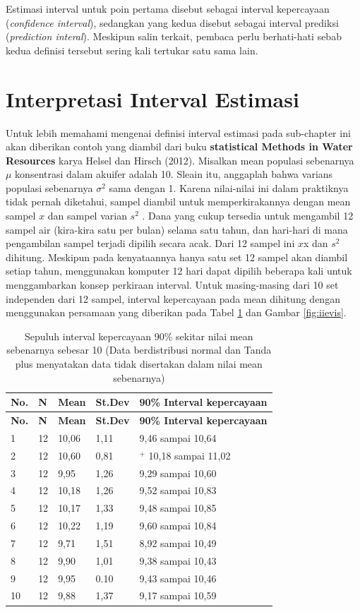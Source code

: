 \documentclass[]{book}
\begin{document}
Estimasi interval untuk poin pertama disebut sebagai interval
kepercayaan (\emph{confidence interval}), sedangkan yang kedua disebut
sebagai interval prediksi (\emph{prediction interal}). Meskipun salin
terkait, pembaca perlu berhati-hati sebab kedua definisi tersebut sering
kali tertukar satu sama lain.

\section{Interpretasi Interval
Estimasi}\label{interpretasi-interval-estimasi}

Untuk lebih memahami mengenai definisi interval estimasi pada
sub-chapter ini akan diberikan contoh yang diambil dari buku
\textbf{statistical Methods in Water Resources} karya Helsel dan Hirsch
(2012). Misalkan mean populasi sebenarnya \(\mu\) konsentrasi dalam
akuifer adalah 10. Sleain itu, anggaplah bahwa varians populasi
sebenarnya \(\sigma^2\) sama dengan 1. Karena nilai-nilai ini dalam
praktiknya tidak pernah diketahui, sampel diambil untuk memperkirakannya
dengan mean sampel \(x\) dan sampel varian \(s^2\) . Dana yang cukup
tersedia untuk mengambil 12 sampel air (kira-kira satu per bulan) selama
satu tahun, dan hari-hari di mana pengambilan sampel terjadi dipilih
secara acak. Dari 12 sampel ini \(x\)x dan \(s^2\) dihitung. Meskipun
pada kenyataannya hanya satu set 12 sampel akan diambil setiap tahun,
menggunakan komputer 12 hari dapat dipilih beberapa kali untuk
menggambarkan konsep perkiraan interval. Untuk masing-masing dari 10 set
independen dari 12 sampel, interval kepercayaan pada mean dihitung
dengan menggunakan persamaan yang diberikan pada Tabel \ref{tab:iie} dan
Gambar \ref{fig:iievis}.

\begin{longtable}[]{@{}lllll@{}}
\caption{\label{tab:iie} Sepuluh interval kepercayaan 90\% sekitar nilai
mean sebenarnya sebesar 10 (Data berdistribusi normal dan Tanda plus
menyatakan data tidak disertakan dalam nilai mean
sebenarnya)}\tabularnewline
\toprule
\textbf{No.} & \textbf{N} & \textbf{Mean} & \textbf{St.Dev} &
\textbf{90\% Interval kepercayaan}\tabularnewline
\midrule
\endfirsthead
\toprule
\textbf{No.} & \textbf{N} & \textbf{Mean} & \textbf{St.Dev} &
\textbf{90\% Interval kepercayaan}\tabularnewline
\midrule
\endhead
1 & 12 & 10,06 & 1,11 & 9,46 sampai 10,64\tabularnewline
2 & 12 & 10,60 & 0,81 & \(^+\) 10,18 sampai 11,02\tabularnewline
3 & 12 & 9,95 & 1,26 & 9,29 sampai 10,60\tabularnewline
4 & 12 & 10,18 & 1,26 & 9,52 sampai 10,83\tabularnewline
5 & 12 & 10,17 & 1,33 & 9,48 sampai 10,85\tabularnewline
6 & 12 & 10,22 & 1,19 & 9,60 sampai 10,84\tabularnewline
7 & 12 & 9,71 & 1,51 & 8,92 sampai 10,49\tabularnewline
8 & 12 & 9,90 & 1,01 & 9,38 sampai 10,43\tabularnewline
9 & 12 & 9,95 & 0.10 & 9,43 sampai 10,46\tabularnewline
10 & 12 & 9,88 & 1,37 & 9,17 sampai 10,59\tabularnewline
\bottomrule
\end{longtable}
\end{document}
